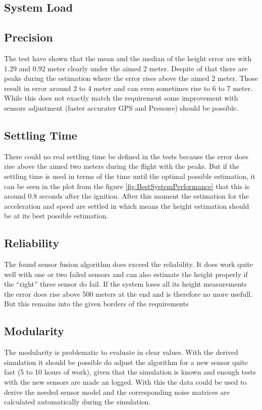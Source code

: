  \subsection{System Load}
 
 
 \subsection{Precision}
 The test have shown that the mean and the median of the height error are with 1.29 and 0.92 meter clearly under the aimed 2 meter.
 Despite of that there are peaks during the estimation where the error rises above the aimed 2 meter.
 Those result in error around 2 to 4 meter and can even sometimes rise to 6 to 7 meter.
 While this does not exactly match the requirement some improvement with sensors adjustment (faster accurater GPS and Pressure) should be possible.
 
 \subsection{Settling Time}
 There could no real settling time be defined in the tests because the error does rise above the aimed two meters during the flight with the peaks.
 But if the settling time is used in terms of the time until the optimal possible estimation,
 it can be seen in the plot from the figure \ref{fig:BestSystemPerformance} that this is around 0.8 seconds after the ignition.
 After this moment the estimation for the acceleration and speed are settled in which means the height estimation should be at its best possible estimation.
 
 \subsection{Reliability}
 The found sensor fusion algorithm does exceed the reliability. 
 It does work quite well with one or two failed sensors and can also estimate the height properly if the ``right'' three sensor do fail.
 If the system loses all its height measurements the error does rise above 500 meters at the end and is therefore no more usefull.
 But this remains into the given borders of the requirements
 
 \subsection{Modularity}
 The modularity is problematic to evaluate in clear values.
 With the derived simulation it should be possible do adjust the algorithm for a new sensor quite fast (5 to 10 hours of work), 
 given that the simulation is known and enough tests with the new sensors are made an logged.
 With this the data could be used to derive the needed sensor model and the corresponding noise matrices are calculated automatically during the simulation.
 

